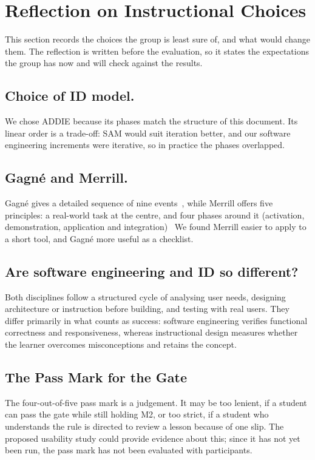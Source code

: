 \section{Reflection on Instructional Choices}\label{sec:id-reflection}


This section records the choices the group is least sure of, and what would change them. The reflection is written before the evaluation, so it states the expectations the group has now and will check against the results.

\subsection{Choice of ID model.} We chose ADDIE because its phases match the structure of this document. Its linear order is a trade-off: SAM would suit iteration better, and our software engineering increments were iterative, so in practice the phases overlapped.
 
\subsection{Gagné and Merrill.} Gagné gives a detailed sequence of nine events~\cite{gagné1985conditions}, while Merrill offers five principles: a real-world task at the centre, and
four phases around it (activation, demonstration, application and
integration)~\cite{Merrill2002} We found Merrill easier to apply to a short tool, and Gagné more useful as a checklist.
 
\subsection{Are software engineering and ID so different?} Both disciplines follow a structured cycle of analysing user needs, designing architecture or instruction before building, and testing with real users. They differ primarily in what counts as success: software engineering verifies functional correctness and responsiveness, whereas instructional design measures whether the learner overcomes misconceptions and retains the concept.

\subsection{The Pass Mark for the Gate}
The four-out-of-five pass mark is a judgement. It may be too lenient, if a student can pass the gate while still holding M2, or too strict, if a student who understands the rule is directed to review a lesson because of one slip. The proposed usability study could provide evidence about this; since it has not yet been run, the pass mark has not been evaluated with participants.

